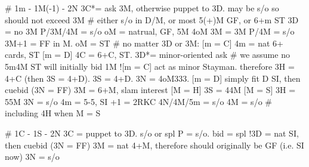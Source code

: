 # 1m - 1M(-1) - 2N
3C*= ask 3M, otherwise puppet to 3D. may be s/o so should not exceed 3M
    # either s/o in D/M, or most 5(+)M GF, or 6+m ST
    3D = no 3M
        P/3M/4M = s/o
        oM = natrual, GF, 5M 4oM
    3M = 3M
        P/4M = s/o
        3M+1 = FF in M. oM = ST
    # no matter 3D or 3M:
        [m = C] 4m = nat 6+ cards, ST
        [m = D] 4C = 6+C, ST. 
3D*= minor-oriented ask  # we assume no 5m4M ST will initially bid 1M
    ![m = C] act as minor Stayman. therefore 3H = 4+C (then 3S = 4+D). 3S = 4+D. 3N = 4oM333.
    [m = D] simply fit D SI, then cuebid (3N = FF)
3M = 6+M, slam interest
[M = H] 3S = 44M
[M = S] 3H = 55M
3N = s/o
4m = 5-5, SI
    +1 = 2RKC
    4N/4M/5m = s/o
4M = s/o  # including 4H when M = S

# 1C - 1S - 2N
3C = puppet to 3D. s/o or spl
    P = s/o. bid = spl
!3D = nat SI, then cuebid (3N = FF)
3M = nat 4+M, therefore should originally be GF (i.e. SI now)
3N = s/o